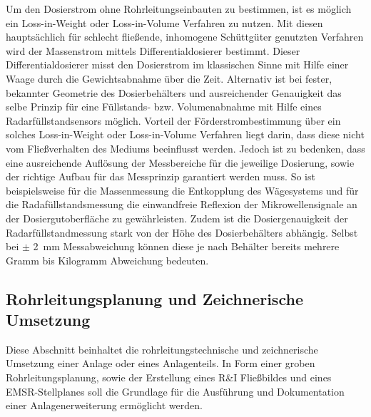 Um den Dosierstrom ohne Rohrleitungseinbauten zu bestimmen, ist es möglich ein Loss-in-Weight oder Loss-in-Volume Verfahren zu nutzen. Mit diesen hauptsächlich für schlecht fließende, inhomogene Schüttgüter genutzten Verfahren wird der Massenstrom mittels Differentialdosierer bestimmt. Dieser Differentialdosierer misst den Dosierstrom im klassischen Sinne mit Hilfe einer Waage durch die Gewichtsabnahme über die Zeit. Alternativ ist bei fester, bekannter Geometrie des Dosierbehälters und ausreichender Genauigkeit das selbe Prinzip für eine Füllstands- bzw. Volumenabnahme mit Hilfe eines Radarfüllstandsensors möglich. Vorteil der Förderstrombestimmung über ein solches Loss-in-Weight oder Loss-in-Volume Verfahren liegt darin, dass diese nicht vom Fließverhalten des Mediums beeinflusst werden. Jedoch ist zu bedenken, dass eine ausreichende Auflösung der Messbereiche für die jeweilige Dosierung, sowie der richtige Aufbau für das Messprinzip garantiert werden muss. So ist beispielsweise für die Massenmessung die Entkopplung des Wägesystems und für die Radafüllstandsmessung die einwandfreie Reflexion der Mikrowellensignale an der Dosiergutoberfläche zu gewährleisten. Zudem ist die Dosiergenauigkeit der Radarfüllstandmessung stark von der Höhe des Dosierbehälters abhängig. Selbst bei $\pm$ \SI{2}{\milli \meter} Messabweichung können diese je nach Behälter bereits mehrere Gramm bis Kilogramm Abweichung bedeuten.\,\mbox{\cite{Vetter.2002, VEGA.07.02.2022}}


%
%




\subsection{Rohrleitungsplanung und Zeichnerische Umsetzung}
Diese Abschnitt beinhaltet die rohrleitungstechnische und zeichnerische Umsetzung einer Anlage oder eines Anlagenteils. In Form einer groben Rohrleitungsplanung, sowie der Erstellung eines R\&I Fließbildes und eines EMSR-Stellplanes soll die Grundlage für die Ausführung und Dokumentation einer Anlagenerweiterung ermöglicht werden.

